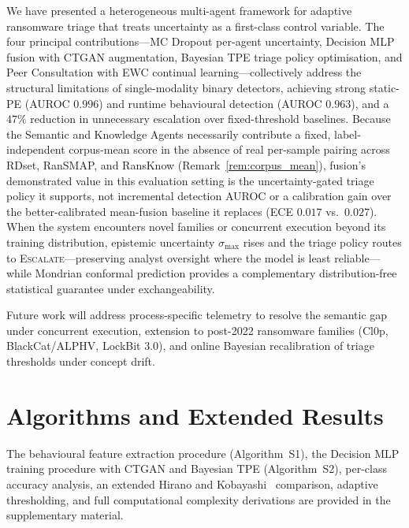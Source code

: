 \documentclass[journal]{IEEEtran}
\begin{document}
We have presented a heterogeneous multi-agent framework for adaptive
ransomware triage that treats uncertainty as a first-class control
variable. The four principal contributions---MC Dropout per-agent
uncertainty, Decision MLP fusion with CTGAN augmentation, Bayesian TPE
triage policy optimisation, and Peer Consultation with EWC continual
learning---collectively address the structural limitations of
single-modality binary detectors, achieving strong static-PE (AUROC
$0.996$) and runtime behavioural detection (AUROC $0.963$), and a $47\%$
reduction in unnecessary escalation over fixed-threshold baselines.
Because the Semantic and Knowledge Agents necessarily contribute a fixed,
label-independent corpus-mean score in the absence of real per-sample
pairing across RDset, RanSMAP, and RansKnow (Remark~\ref{rem:corpus_mean}),
fusion's demonstrated value in this evaluation setting is the
uncertainty-gated triage policy it supports, not incremental detection
AUROC or a calibration gain over the better-calibrated mean-fusion
baseline it replaces (ECE $0.017$ vs.\ $0.027$). When the system encounters novel families or
concurrent execution beyond its training distribution, epistemic
uncertainty $\sigma_{\max}$ rises and the triage policy routes to
\textsc{Escalate}---preserving analyst oversight where the model is least
reliable---while Mondrian conformal prediction provides a complementary
distribution-free statistical guarantee under exchangeability.

Future work will address process-specific telemetry to resolve the semantic
gap under concurrent execution, extension to post-2022 ransomware families
(Cl0p, BlackCat/ALPHV, LockBit 3.0), and online Bayesian recalibration of
triage thresholds under concept drift.

\appendices

\section{Algorithms and Extended Results}\label{app:supp}

The behavioural feature extraction procedure (Algorithm~S1), the Decision
MLP training procedure with CTGAN and Bayesian TPE (Algorithm~S2),
per-class accuracy analysis, an extended Hirano and
Kobayashi~\cite{hirano2025ransmap} comparison, adaptive thresholding, and
full computational complexity derivations are provided in the
supplementary material.
\end{document}
